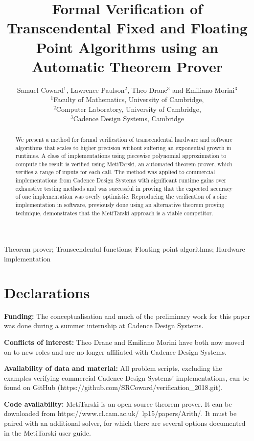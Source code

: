 \documentclass{fac}
\title[Transcendental Verification using Theorem Proving]{Formal Verification of Transcendental Fixed and Floating Point Algorithms using an Automatic Theorem Prover}
\author[Samuel Coward]
    {Samuel Coward$^1$, Lawrence Paulson$^2$, Theo Drane$^3$ and Emiliano Morini$^3$\\
     $^1$Faculty of Mathematics, University of Cambridge,\\
     $^2$Computer Laboratory, University of Cambridge,\\
     $^3$Cadence Design Systems, Cambridge\\}
\begin{document}
\label{firstpage}

\makecorrespond

\maketitle

\begin{abstract}
We present a method for formal verification of transcendental hardware and software algorithms that scales to higher precision without suffering an exponential growth in runtimes. A class of implementations using piecewise polynomial approximation to compute the result is verified using MetiTarski, an automated theorem prover, which verifies a range of inputs for each call. The method was applied to commercial implementations from Cadence Design Systems with significant runtime gains over exhaustive testing methods and was successful in proving that the expected accuracy of one implementation was overly optimistic. Reproducing the verification of a sine implementation in software, previously done using an alternative theorem proving technique, demonstrates that the MetiTarski approach is a viable competitor. 
\end{abstract}
\begin{keywords}Theorem prover; Transcendental functions; Floating point algorithms; Hardware implementation
\end{keywords}

\section*{Declarations}
\textbf{Funding:} The conceptualisation and much of the preliminary work for this paper was done during a summer internship at Cadence Design Systems.

\noindent\textbf{Conflicts of interest:} Theo Drane and Emiliano Morini have both now moved on to new roles and are no longer affiliated with Cadence Design Systems. 

\noindent\textbf{Availability of data and material:} All problem scripts, excluding the examples verifying commercial Cadence Design Systems' implementations, can be found on GitHub \newline (https://github.com/SRCoward/verification\_2018.git).

\noindent\textbf{Code availability:} MetiTarski is an open source theorem prover. It can be downloaded from
\newline https://www.cl.cam.ac.uk/~lp15/papers/Arith/. It must be paired with an additional solver, for which there are several options documented in the MetiTarski user guide.
\end{document}
